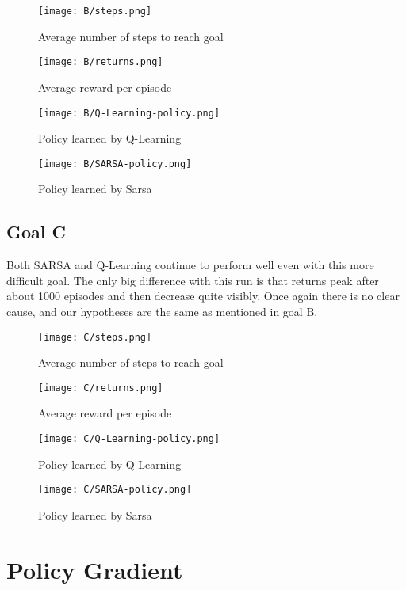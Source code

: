 \documentclass[a4paper]{article}
\begin{document}
\begin{figure}[htbp!]
\center
\texttt{[image: B/steps.png]}
\caption{Average number of steps to reach goal}
\end{figure}

\begin{figure}[htbp!]
\center
\texttt{[image: B/returns.png]}
\caption{Average reward per episode}
\end{figure}

\begin{figure}[htbp!]
\center
\texttt{[image: B/Q-Learning-policy.png]}
\caption{Policy learned by Q-Learning}
\end{figure}

\begin{figure}[htbp!]
\center
\texttt{[image: B/SARSA-policy.png]}
\caption{Policy learned by Sarsa}
\end{figure}


\newpage
\subsection{Goal C}
Both SARSA and Q-Learning continue to perform well even with this more difficult goal.
The only big difference with this run is that returns peak after about 1000 episodes and
then decrease quite visibly.  Once again there is no clear cause, and our hypotheses are the
same as mentioned in goal B.

\begin{figure}[htbp!]
\center
\texttt{[image: C/steps.png]}
\caption{Average number of steps to reach goal}
\end{figure}

\begin{figure}[htbp!]
\center
\texttt{[image: C/returns.png]}
\caption{Average reward per episode}
\end{figure}

\begin{figure}[htbp!]
\center
\texttt{[image: C/Q-Learning-policy.png]}
\caption{Policy learned by Q-Learning}
\end{figure}

\begin{figure}[htbp!]
\center
\texttt{[image: C/SARSA-policy.png]}
\caption{Policy learned by Sarsa}
\end{figure}

\section{Policy Gradient}
\end{document}

